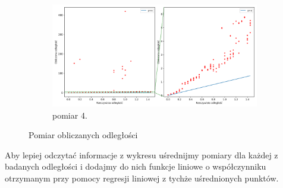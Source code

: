 \begin{figure}[H]
    \ContinuedFloat\centering
    \begin{subfigure}{\textwidth}
        \centering
        \includegraphics[width=\textwidth]{pics/mic_sync_dist/dists_long_3.png}
        \caption{pomiar 4.}
        \label{pic:slope_test_3}
    \end{subfigure}
    \caption{Pomiar obliczanych odległości}
    \label{fig:slope_test}
\end{figure}

Aby lepiej odczytać informacje z wykresu uśrednijmy pomiary dla każdej z badanych odległości i dodajmy do nich funkcje liniowe o współczynniku otrzymanym przy pomocy regresji liniowej z tychże uśrednionych punktów.

